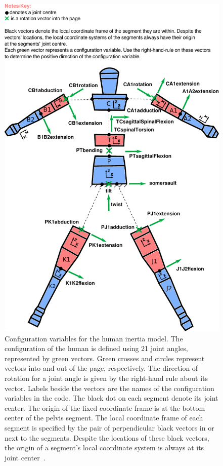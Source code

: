 \documentclass[10pt,a4paper,twocolumn]{article}
\begin{document}
\begin{figure}
  \begin{center}
    \includegraphics[width=1.6\columnwidth]{figures/configuration.pdf}
  \end{center}
  \caption{
    Configuration variables for the human inertia model. The
    configuration of the human is defined using 21 joint angles, represented by
    green vectors. Green crosses and circles represent vectors into and out of the page, respectively. The direction of rotation for a
    joint angle is given by the right-hand rule about its vector. Labels
    beside the vectors are the names of the configuration variables in the
    code. The black dot on each segment denote its joint center. The origin
    of the fixed coordinate frame is at the bottom center of the pelvis
    segment. The local coordinate frame of each segment is specified by the
    pair of perpendicular black vectors in or next to the segments. Despite the
    locations of these black vectors, the origin of a segment's local
    coordinate system is always at its joint center~\cite{Yeadon1990e}.
  }
  \label{fig:config}
\end{figure}
\end{document}
